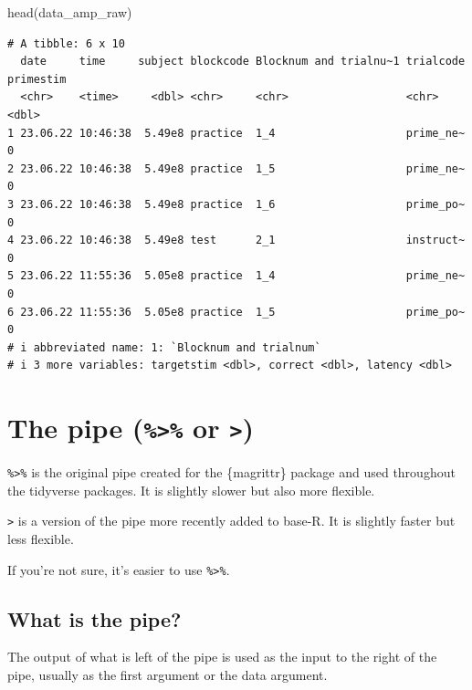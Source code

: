 \documentclass[
  letterpaper,
  DIV=11,
  numbers=noendperiod]{scrreprt}
\newenvironment{Shaded}{\begin{snugshade}}{\end{snugshade}}
\newcommand{\FunctionTok}[1]{\textcolor[rgb]{0.28,0.35,0.67}{#1}}
\newcommand{\NormalTok}[1]{\textcolor[rgb]{0.00,0.23,0.31}{#1}}
\begin{document}
\begin{Shaded}
\begin{Highlighting}[]
\FunctionTok{head}\NormalTok{(data\_amp\_raw)}
\end{Highlighting}
\end{Shaded}

\begin{verbatim}
# A tibble: 6 x 10
  date     time     subject blockcode Blocknum and trialnu~1 trialcode primestim
  <chr>    <time>     <dbl> <chr>     <chr>                  <chr>         <dbl>
1 23.06.22 10:46:38  5.49e8 practice  1_4                    prime_ne~         0
2 23.06.22 10:46:38  5.49e8 practice  1_5                    prime_ne~         0
3 23.06.22 10:46:38  5.49e8 practice  1_6                    prime_po~         0
4 23.06.22 10:46:38  5.49e8 test      2_1                    instruct~         0
5 23.06.22 11:55:36  5.05e8 practice  1_4                    prime_ne~         0
6 23.06.22 11:55:36  5.05e8 practice  1_5                    prime_po~         0
# i abbreviated name: 1: `Blocknum and trialnum`
# i 3 more variables: targetstim <dbl>, correct <dbl>, latency <dbl>
\end{verbatim}

\section{\texorpdfstring{The pipe (\texttt{\%\textgreater{}\%} or
\texttt{\textbar{}\textgreater{}})}{The pipe (\%\textgreater\% or \textbar\textgreater)}}\label{the-pipe-or}

\texttt{\%\textgreater{}\%} is the original pipe created for the
\{magrittr\} package and used throughout the tidyverse packages. It is
slightly slower but also more flexible.

\texttt{\textbar{}\textgreater{}} is a version of the pipe more recently
added to base-R. It is slightly faster but less flexible.

If you're not sure, it's easier to use \texttt{\%\textgreater{}\%}.

\subsection{What is the pipe?}\label{what-is-the-pipe}

The output of what is left of the pipe is used as the input to the right
of the pipe, usually as the first argument or the data argument.
\end{document}
